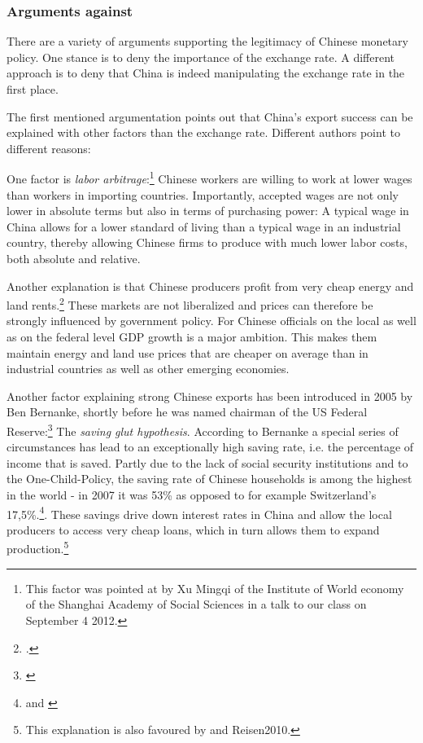 \subsubsection{Arguments against}

There are a variety of arguments supporting the legitimacy of Chinese 
monetary policy.  One stance is to deny the importance of the exchange 
rate. A different approach is to deny that China is indeed manipulating 
the exchange rate in the first place.

The first mentioned argumentation points out that China's export success 
can be explained with other factors than the exchange rate.  Different 
authors point to different reasons: 

One factor is \emph{labor arbitrage}:\footnote{This factor was pointed at 
by Xu Mingqi of the Institute of World economy of the Shanghai Academy 
of Social Sciences in a talk to our class on September 4 2012.} Chinese 
workers are willing to work at lower wages than workers in importing 
countries. Importantly, accepted wages are not only lower in absolute 
terms but also in terms of purchasing power: A typical wage in China 
allows for a lower standard of living than a typical wage in an 
industrial country, thereby allowing Chinese firms to produce with much 
lower labor costs, both absolute and relative. 

Another explanation is that Chinese producers profit from very cheap energy and land 
rents.\footnote{\cite[pp.  25]{Huang2010}.} These markets are not 
liberalized and prices can therefore be strongly influenced by 
government policy. For Chinese officials on the local as well as on the 
federal level GDP growth is a major ambition. This makes them maintain 
energy and land use prices that are cheaper on average than in 
industrial countries as well as other emerging economies.

Another factor explaining strong Chinese exports has been introduced 
in 2005 by Ben Bernanke, shortly before he was named chairman of the US 
Federal Reserve:\footnote{\cite{Bernanke2005}} The \emph{saving glut 
hypothesis}. According to Bernanke a special series of circumstances has 
lead to an exceptionally high saving rate, i.e. the percentage of income 
that is saved. Partly due to the lack of social security institutions 
and to the One-Child-Policy, the saving rate of Chinese households is 
among the highest in the world - in 2007 it was 53\% as opposed to for 
example Switzerland's 17,5\%.\footnote{\cite[pp.  20]{Yang2011} and 
\cite{BFS2012}}. These savings drive down interest rates in China and 
allow the local producers to access very cheap loans, which in turn 
allows them to expand production.\footnote{This explanation is also 
favoured by \cite[pp. 41]{Wyplosz2010} and \cite{p.  65}{Reisen2010}.}

